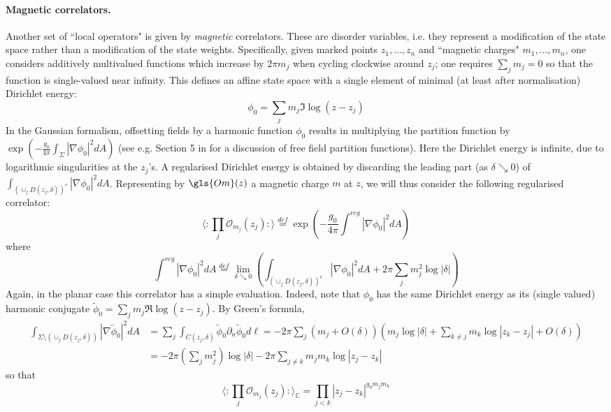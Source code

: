 \documentclass[10pt]{article}
\newcommand{\C}{\mathbb{C}}
\newcommand{\mc}{\mathcal}
\begin{document}
\paragraph{Magnetic correlators.\\}
Another set of ``local operators" is given by {\em magnetic} correlators.  
These are disorder variables, i.e. they represent a modification of the state space rather than a modification of the state weights. Specifically, given marked points $z_1,\dots,z_{n}$ and ``magnetic charges" $m_1,\dots,m_n$, one considers additively multivalued functions which increase by $2\pi m_j$ when cycling clockwise around $z_j$; one requires $\sum_jm_j=0$ so that the function is single-valued near infinity. This defines an affine state space with a single element of minimal (at least after normalisation) Dirichlet energy: 
$$\phi_0=\sum_jm_j\Im\log(z-z_j)$$
In the Gaussian formalism, offsetting fields by a harmonic function $\phi_0$ results in multiplying the partition function by $\exp(-\frac{g_0}{4\pi}\int_\Sigma |\nabla\phi_0|^2dA)$ (see e.g. Section 5 in \cite{Dub_SLEGFF} for a discussion of free field partition functions). Here the Dirichlet energy is infinite, due to logarithmic singularities at the $z_j$'s. A regularised Dirichlet energy is obtained by discarding the leading part (as $\delta\searrow 0$) of $\int_{(\cup_j D(z_j,\delta))^c}|\nabla \phi_0|^2dA$. Representing by $\gls{Om}(z)$ a magnetic charge $m$ at $z$, we will thus consider the following regularised correlator:
$$\langle :\prod_j{\mc O}_{m_j}(z_j):\rangle\stackrel{def}{=}\exp\left(-\frac{g_0}{4\pi}\int^{reg}|\nabla\phi_0|^2dA\right)$$
where
$$\int^{reg}|\nabla\phi_0|^2dA\stackrel{def}{=}\lim_{\delta\searrow 0}\left(\int_{(\cup_j D(z_j,\delta))^c}|\nabla\phi_0|^2dA+2\pi\sum_jm_j^2\log|\delta|\right)$$
Again, in the planar case this correlator has a simple evaluation. Indeed, note that $\phi_0$ has the same Dirichlet energy as its (single valued) harmonic conjugate $\tilde\phi_0=\sum_j m_j\Re\log(z-z_j)$. By Green's formula,
\begin{align*}
\int_{\Sigma\setminus(\cup_j D(z_j,\delta))}|\nabla \tilde\phi_0|^2dA
&=\sum_j\int_{C(z_j,\delta)}\tilde\phi_0\partial_n\tilde\phi_0 d\ell=-2\pi\sum_j (m_j+O(\delta))(m_j\log|\delta|+\sum_{k\neq j}m_k\log|z_k-z_j|+O(\delta))\\
&=-{2\pi}(\sum_j m_j^2)\log|\delta|-{2\pi}\sum_{j\neq k}m_jm_k\log|z_j-z_k|
\end{align*}
so that
\begin{equation}\label{eq:GFFmagncorr}
\langle :\prod_j{\mc O}_{m_j}(z_j):\rangle_\C=\prod_{j<k}|z_j-z_k|^{g_0m_jm_k}
\end{equation}
\end{document}
